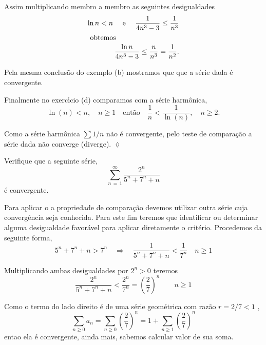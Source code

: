 Assim multiplicando membro a membro as seguintes desigualdades
\begin{align*}
    \ln n <n \quad \text{ e }\quad \frac{1}{4n^3-3}\le
    \frac{1}{n^3}\\
    \intertext{ obtemos }
\frac{\ln n}{4n^3-3}\le \frac{n}{n^3}=\frac{1}{n^2}.
\end{align*}

Pela mesma conclus\~{a}o do exemplo (b) mostramos que que a s\'{e}rie dada
\'{e} convergente.

Finalmente no exerc\'{\i}cio (d) comparamos com a s\'{e}rie harm\^{o}nica,
\begin{equation*}
    \ln(n)<n,\quad n\ge 1\quad\text{ent\~{a}o}\quad \frac{1}{n}<\frac{1}{\ln(n)}, \quad
    n\ge 2.
\end{equation*}

Como a s\'{e}rie harm\^{o}nica $\sum 1/n$ n\~{a}o \'{e} convergente, pelo teste de
compara\c{c}\~{a}o a s\'{e}rie dada n\~{a}o converge (diverge). \hfill \(\lozenge\)

\begin{exer}
Verifique que a seguinte s\'{e}rie,
\begin{equation*}
    \sum_{n\,=\, 1}^{\infty}\dfrac{2^n}{5^n+7^n+n}
\end{equation*}
\'{e} convergente.
\end{exer}

\solo Para aplicar o a propriedade de compara\c{c}\~{a}o devemos utilizar
outra s\'{e}rie cuja converg\^{e}ncia seja conhecida. Para este fim teremos
que identificar ou determinar alguma desigualdade favor\'{a}vel para
aplicar diretamente o crit\'{e}rio. Procedemos da seguinte forma,
\begin{equation*}
    5^n+7^n+n>7^n\quad \Rightarrow\quad \frac{1}{5^n+7^n+n}<
    \frac{1}{7^n}\quad n\ge 1
\end{equation*}

Multiplicando ambas desigualdades por $2^n>0$ teremos
\begin{equation*}
\frac{2^n}{5^n+7^n+n}< \frac{2^n}{7^n}=\left(
\frac{2}{7}\right)^n\qquad n\ge 1
\end{equation*}

Como o termo do lado direito \'{e} de uma s\'{e}rie geom\'{e}trica com raz\~{a}o
$r=2/7<1$ ,
\begin{equation*}
 \sum_{n\ge 0}a_n=\sum_{n\ge 0}\left(\frac{2}{7}\right)^n=1+\sum_{n\ge 1}\left(\frac{2}{7}\right)^n
\end{equation*}
entao ela \'{e} convergente, ainda mais, sabemos calcular valor de sua
soma.

